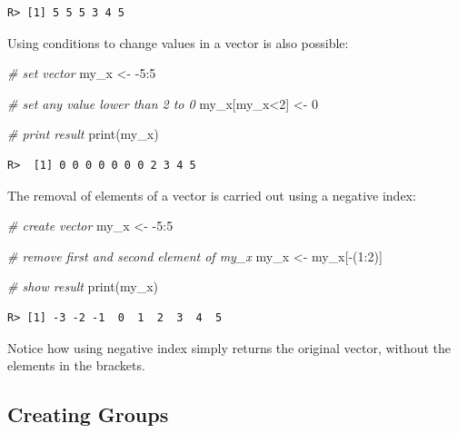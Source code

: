 \documentclass[
  12pt,
]{book}
\newenvironment{Shaded}{\begin{snugshade}}{\end{snugshade}}
\newcommand{\CommentTok}[1]{\textcolor[rgb]{0.37,0.37,0.37}{\textit{#1}}}
\newcommand{\DecValTok}[1]{\textcolor[rgb]{0.06,0.06,0.06}{#1}}
\newcommand{\FunctionTok}[1]{\textcolor[rgb]{0,0,0}{#1}}
\newcommand{\NormalTok}[1]{#1}
\newcommand{\OtherTok}[1]{\textcolor[rgb]{0.37,0.37,0.37}{#1}}
\newcommand{\SpecialCharTok}[1]{\textcolor[rgb]{0,0,0}{#1}}
\begin{document}
\begin{verbatim}
R> [1] 5 5 5 3 4 5
\end{verbatim}

Using conditions to change values in a vector is also possible:

\begin{Shaded}
\begin{Highlighting}[]
\CommentTok{\# set vector}
\NormalTok{my\_x }\OtherTok{\textless{}{-}} \SpecialCharTok{{-}}\DecValTok{5}\SpecialCharTok{:}\DecValTok{5}

\CommentTok{\# set any value lower than 2 to 0}
\NormalTok{my\_x[my\_x}\SpecialCharTok{\textless{}}\DecValTok{2}\NormalTok{] }\OtherTok{\textless{}{-}} \DecValTok{0}

\CommentTok{\# print result}
\FunctionTok{print}\NormalTok{(my\_x)}
\end{Highlighting}
\end{Shaded}

\begin{verbatim}
R>  [1] 0 0 0 0 0 0 0 2 3 4 5
\end{verbatim}

The removal of elements of a vector is carried out using a negative index:

\begin{Shaded}
\begin{Highlighting}[]
\CommentTok{\# create vector}
\NormalTok{my\_x }\OtherTok{\textless{}{-}} \SpecialCharTok{{-}}\DecValTok{5}\SpecialCharTok{:}\DecValTok{5}

\CommentTok{\# remove first and second element of my\_x}
\NormalTok{my\_x }\OtherTok{\textless{}{-}}\NormalTok{ my\_x[}\SpecialCharTok{{-}}\NormalTok{(}\DecValTok{1}\SpecialCharTok{:}\DecValTok{2}\NormalTok{)]}

\CommentTok{\# show result}
\FunctionTok{print}\NormalTok{(my\_x)}
\end{Highlighting}
\end{Shaded}

\begin{verbatim}
R> [1] -3 -2 -1  0  1  2  3  4  5
\end{verbatim}

Notice how using negative index simply returns the original vector, without the elements in the brackets.

\hypertarget{creating-groups}{%
\subsection{Creating Groups}\label{creating-groups}}
\end{document}

